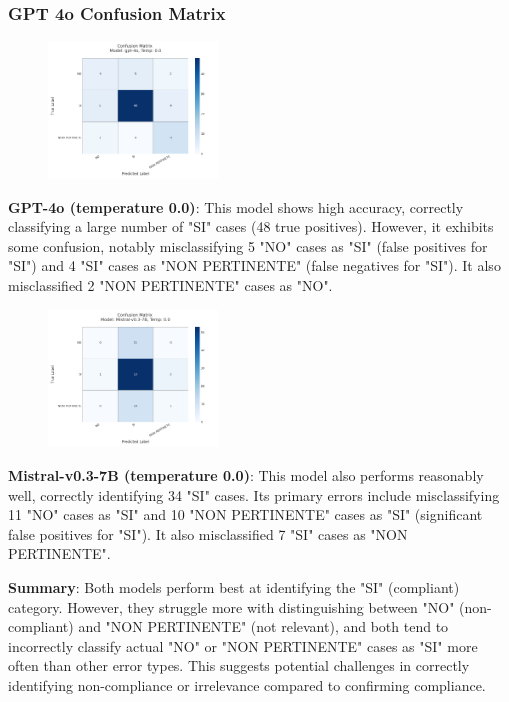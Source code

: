 \documentclass[../main.tex]{subfiles}
\begin{document}
\subsubsection{GPT 4o Confusion Matrix}
\begin{figure}
    \centering
    \includegraphics[width=0.40\textwidth]{Graphs/Confusion Matrix GPT 4o.png}
\end{figure}


\textbf{GPT-4o (temperature 0.0)}: This model shows high accuracy, correctly classifying a large number of "SI" cases (48 true positives). However, it exhibits some confusion, notably misclassifying 5 "NO" cases as "SI" (false positives for "SI") and 4 "SI" cases as "NON PERTINENTE" (false negatives for "SI"). It also misclassified 2 "NON PERTINENTE" cases as "NO".


\begin{figure}
    \includegraphics[width=0.40\textwidth]{Graphs/Confusion Matrix Mistral.png}
\end{figure}

\textbf{Mistral-v0.3-7B (temperature 0.0)}: This model also performs reasonably well, correctly identifying 34 "SI" cases. Its primary errors include misclassifying 11 "NO" cases as "SI" and 10 "NON PERTINENTE" cases as "SI" (significant false positives for "SI"). It also misclassified 7 "SI" cases as "NON PERTINENTE".

\textbf{Summary}: Both models perform best at identifying the "SI" (compliant) category. However, they struggle more with distinguishing between "NO" (non-compliant) and "NON PERTINENTE" (not relevant), and both tend to incorrectly classify actual "NO" or "NON PERTINENTE" cases as "SI" more often than other error types. This suggests potential challenges in correctly identifying non-compliance or irrelevance compared to confirming compliance. 


\ifSubfilesClassLoaded{
    
    
}{}
\end{document}

